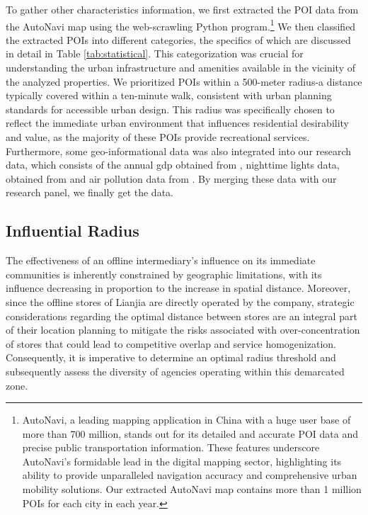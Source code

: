 \documentclass[12pt]{article}
\begin{document}
To gather other characteristics information, we first extracted the POI data from the AutoNavi map using the web-scrawling Python program.\footnote{AutoNavi, a leading mapping application in China with a huge user base of more than 700 million, stands out for its detailed and accurate POI data and precise public transportation information. These features underscore AutoNavi's formidable lead in the digital mapping sector, highlighting its ability to provide unparalleled navigation accuracy and comprehensive urban mobility solutions. Our extracted AutoNavi map contains more than 1 million POIs for each city in each year.} We then classified the extracted POIs into different categories, the specifics of which are discussed in detail in Table \ref{tab:statistical}. This categorization was crucial for understanding the urban infrastructure and amenities available in the vicinity of the analyzed properties. We prioritized POIs within a 500-meter radius-a distance typically covered within a ten-minute walk, consistent with urban planning standards for accessible urban design. This radius was specifically chosen to reflect the immediate urban environment that influences residential desirability and value, as the majority of these POIs provide recreational services. Furthermore, some geo-informational data was also integrated into our research data, which consists of the annual gdp obtained from \citep{zhao_forecasting_2017}, nighttime lights data, obtained from \citep{elvidge_annual_2021} and air pollution data from \citep{doi:10.1021/acs.est.1c05309}. By merging these data with our research panel, we finally get the data.


\subsection{Influential Radius} \label{subsec:Influential_Radius}

The effectiveness of an offline intermediary's influence on its immediate communities is inherently constrained by geographic limitations, with its influence decreasing in proportion to the increase in spatial distance. Moreover, since the offline stores of Lianjia are directly operated by the company, strategic considerations regarding the optimal distance between stores are an integral part of their location planning to mitigate the risks associated with over-concentration of stores that could lead to competitive overlap and service homogenization. Consequently, it is imperative to determine an optimal radius threshold and subsequently assess the diversity of agencies operating within this demarcated zone.
\end{document}
